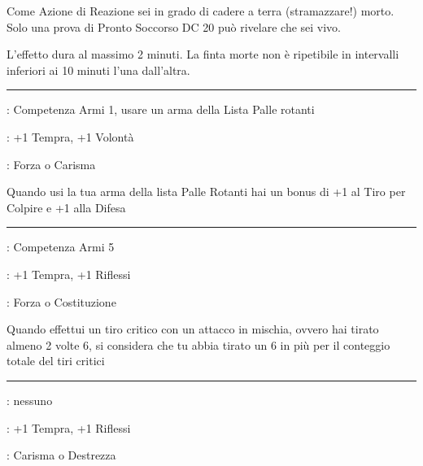 \begin{multicols}{2}
Come Azione di Reazione sei in grado di cadere a terra (stramazzare!) morto. Solo una prova di Pronto Soccorso DC 20 può rivelare che sei vivo.

L'effetto dura al massimo 2 minuti. La finta morte non è ripetibile in intervalli inferiori ai 10 minuti l'una dall'altra.

\smallskip\noindent\rule{\linewidth}{2pt} \hypertarget{Flagello Danzante}{}\medskip{}
\noindent
\begin{description}[noitemsep, topsep=0pt, parsep=0pt, partopsep=0pt, leftmargin=0cm, labelwidth=2.5cm]
    \item[\textbf{Requisito}]: Competenza Armi 1, usare un arma della Lista Palle rotanti
    \item[\textbf{Tiri Salvezza}]: +1 Tempra, +1 Volontà
    \item[\textbf{Caratteristica}]: Forza o Carisma
\end{description}

Quando usi la tua arma della lista Palle Rotanti hai un bonus di +1 al Tiro per Colpire e +1 alla Difesa

\smallskip\noindent\rule{\linewidth}{2pt} \hypertarget{Forgiato nella furia}{}\medskip{}
\noindent
\begin{description}[noitemsep, topsep=0pt, parsep=0pt, partopsep=0pt, leftmargin=0cm, labelwidth=2.5cm]
    \item[\textbf{Requisito}]: Competenza Armi 5
    \item[\textbf{Tiri Salvezza}]: +1 Tempra, +1 Riflessi
    \item[\textbf{Caratteristica}]: Forza o Costituzione
\end{description}

Quando effettui un tiro critico con un attacco in mischia, ovvero hai tirato almeno 2 volte 6, si considera che tu abbia tirato un 6 in più per il conteggio totale del tiri critici

\smallskip\noindent\rule{\linewidth}{2pt} \hypertarget{Fortunato}{}\medskip{}
\noindent
\begin{description}[noitemsep, topsep=0pt, parsep=0pt, partopsep=0pt, leftmargin=0cm, labelwidth=2.5cm]
    \item[\textbf{Requisito}]: nessuno
    \item[\textbf{Tiri Salvezza}]: +1 Tempra, +1 Riflessi
    \item[\textbf{Caratteristica}]: Carisma o Destrezza
\end{description}


\end{multicols}
